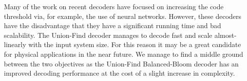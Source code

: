 Many of the work on recent decoders have focused on increasing the code threshold via, for example, the use of neural networks. However, these decoders have the disadvantage that they have a significant running time and bad scalability. The Union-Find decoder manages to decode fast and scale almost-linearly with the input system size. For this reason it may be a great candidate for physical applications in the near future. We manage to find a middle ground between the two objectives as the Union-Find Balanced-Bloom decoder has an improved decoding performance at the cost of a slight increase in complexity. 

